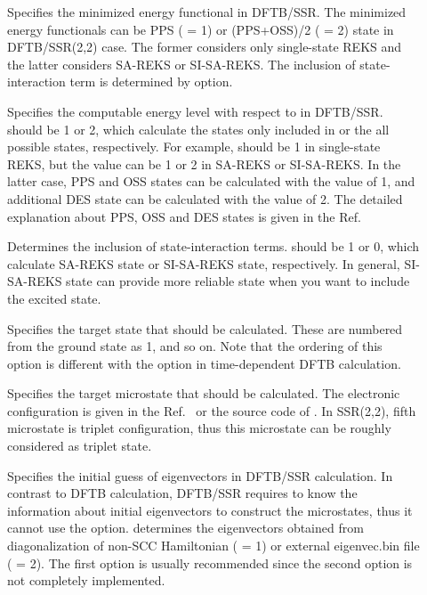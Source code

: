   \begin{description}

  \item[] Specifies the minimized energy functional in DFTB/SSR.
    The minimized energy functionals can be PPS ( = 1) or (PPS+OSS)/2
    ( = 2) state in DFTB/SSR(2,2) case. The former considers only
    single-state REKS and the latter considers SA-REKS or SI-SA-REKS. The inclusion of
    state-interaction term is determined by  option.

  \item[] Specifies the computable energy level with respect to 
    in DFTB/SSR.  should be 1 or 2, which calculate the states only included in
     or the all possible states, respectively. For example, 
    should be 1 in single-state REKS, but the value can be 1 or 2 in SA-REKS or SI-SA-REKS.
    In the latter case, PPS and OSS states can be calculated with the value of 1, and additional DES state
    can be calculated with the value of 2. The detailed explanation about PPS, OSS and DES states
    is given in the Ref.~\cite{Lee_JCTC_2019}

  \item[] Determines the inclusion of state-interaction terms. 
    should be 1 or 0, which calculate SA-REKS state or SI-SA-REKS state, respectively. In general,
    SI-SA-REKS state can provide more reliable state when you want to include the excited state.

  \item[] Specifies the target state that should be calculated. These are numbered
    from the ground state as 1, and so on. Note that the ordering of this option is different with the option
     in time-dependent DFTB calculation.

  \item[] Specifies the target microstate that should be calculated. The electronic
    configuration is given in the Ref.~\cite{Lee_JCTC_2019} or the source code of \dftbp{}. In SSR(2,2),
    fifth microstate is triplet configuration, thus this microstate can be roughly considered as triplet state.

  \item[] Specifies the initial guess of eigenvectors in DFTB/SSR calculation.
    In contrast to DFTB calculation, DFTB/SSR requires to know the information about initial eigenvectors
    to construct the microstates, thus it cannot use the  option. 
    determines the eigenvectors obtained from diagonalization of non-SCC Hamiltonian ( = 1)
    or external eigenvec.bin file ( = 2). The first option is usually recommended since
    the second option is not completely implemented.


\end{description}
